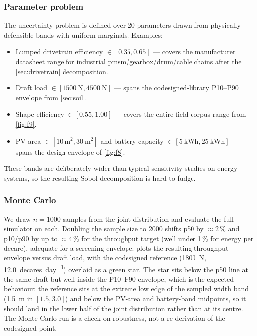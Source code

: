 \documentclass[11pt,a4paper]{article}
\begin{document}
\subsubsection{Parameter problem}\label{sec:uq-problem}

The uncertainty problem is defined over 20 parameters drawn from physically defensible bands with uniform marginals. Examples:

\begin{itemize}[leftmargin=1.6em,itemsep=0.1em]
    \item Lumped drivetrain efficiency $\in [0.35, 0.65]$ --- covers the manufacturer datasheet range for industrial \gls{pmsm}/gearbox/drum/cable chains after the \cref{sec:drivetrain} decomposition.
    \item Draft load $\in [\SI{1500}{\newton}, \SI{4500}{\newton}]$ --- spans the codesigned-library P10--P90 envelope from \cref{sec:soil}.
    \item Shape efficiency $\in [0.55, 1.00]$ --- covers the entire field-corpus range from \cref{fig:f9}.
    \item PV area $\in [\SI{10}{\meter\squared}, \SI{30}{\meter\squared}]$ and battery capacity $\in [\SI{5}{\kWh}, \SI{25}{\kWh}]$ --- spans the design envelope of \cref{fig:f8}.
\end{itemize}

These bands are deliberately wider than typical sensitivity studies on energy systems, so the resulting Sobol decomposition is hard to fudge.

\subsubsection{Monte Carlo}\label{sec:mc}

We draw $n = 1000$ samples from the joint distribution and evaluate the full simulator on each. Doubling the sample size to 2000 shifts \gls{p50} by ${\approx}2\,\%$ and \gls{p10}/\gls{p90} by up to ${\approx}4\,\%$ for the throughput target (well under 1\,\% for energy per decare), adequate for a screening envelope.  plots the resulting throughput envelope versus draft load, with the codesigned reference (\SI{1800}{\newton}, \SI{12.0}{decares\per day}) overlaid as a green star. The star sits below the \gls{p50} line at the same draft but well inside the P10--P90 envelope, which is the expected behaviour: the reference sits at the extreme low edge of the sampled width band (\SI{1.5}{\meter} in $[1.5, 3.0]$) and below the PV-area and battery-band midpoints, so it should land in the lower half of the joint distribution rather than at its centre. The Monte Carlo run is a check on robustness, not a re-derivation of the codesigned point.
\end{document}
